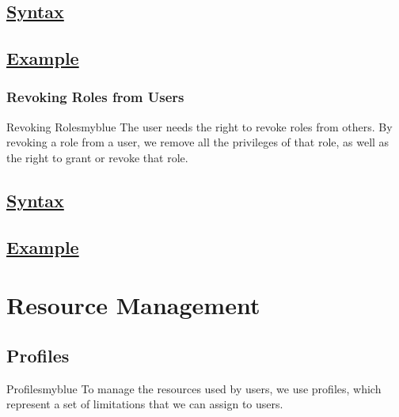 \vspace{0.15cm}
\subsection*{\underline{Syntax}} 


\vspace{0.15cm}
\subsection*{\underline{Example}} 



\vspace{0.25cm}
\subsubsection{Revoking Roles from Users} 
\begin{prettyBox}{Revoking Roles}{myblue}
The user needs the right to revoke roles from others. By revoking a role from
a user, we remove all the privileges of that role, as well as the right to
grant or revoke that role.
\end{prettyBox}

\vspace{0.15cm}
\subsection*{\underline{Syntax}} 


\vspace{0.15cm}
\subsection*{\underline{Example}} 


\vspace{0.35cm}
\section{Resource Management}

\subsection{Profiles} 
\begin{prettyBox}{Profiles}{myblue} To manage the resources used by users,
we use profiles, which represent a set of limitations that we can assign
to users.
\end{prettyBox}

